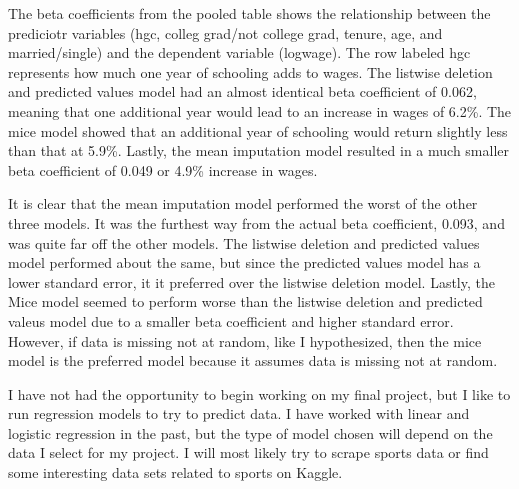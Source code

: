 \documentclass{article}
\begin{document}
The beta coefficients from the pooled table shows the relationship between the prediciotr variables (hgc, colleg grad/not college grad, tenure, age, and married/single) and the dependent variable (logwage). The row labeled hgc represents how much one year of schooling adds to wages. The listwise deletion and predicted values model had an almost identical beta coefficient of 0.062, meaning that one additional year would lead to an increase in wages of 6.2\%. The mice model showed that an additional year of schooling would return slightly less than that at 5.9\%. Lastly, the mean imputation model resulted in a much smaller beta coefficient of 0.049 or 4.9\% increase in wages.

It is clear that the mean imputation model performed the worst of the other three models. It was the furthest way from the actual beta coefficient, 0.093, and was quite far off the other models. The listwise deletion and predicted values model performed about the same, but since the predicted values model has a lower standard error, it it preferred over the listwise deletion model. Lastly, the Mice model seemed to perform worse than the listwise deletion and predicted valeus model due to a smaller beta coefficient and higher standard error. However, if data is missing not at random,  like I hypothesized, then the mice model is the preferred model because it assumes data is missing not at random.

I have not had the opportunity to begin working on my final project, but I like to run regression models to try to predict data. I have worked with linear and logistic regression in the past, but the type of model chosen will depend on the data I select for my project. I will most likely try to scrape sports data or find some interesting data sets related to sports on Kaggle.
\end{document}
